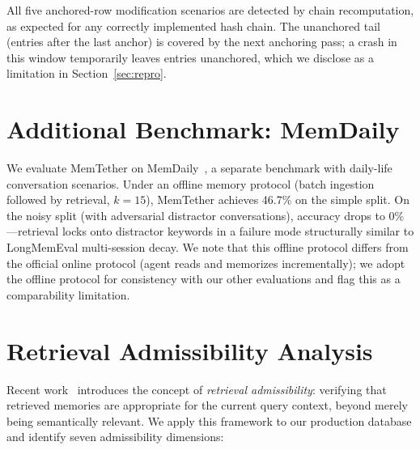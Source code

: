 \documentclass{article}
\begin{document}
All five anchored-row modification scenarios are detected by chain recomputation, as expected for any correctly implemented hash chain. The unanchored tail (entries after the last anchor) is covered by the next anchoring pass; a crash in this window temporarily leaves entries unanchored, which we disclose as a limitation in Section~\ref{sec:repro}.



\section{Additional Benchmark: MemDaily}
\label{sec:memdaily}

We evaluate MemTether on MemDaily~\citep{memdaily}, a separate benchmark with daily-life conversation scenarios. Under an offline memory protocol (batch ingestion followed by retrieval, $k{=}15$), MemTether achieves 46.7\% on the simple split. On the noisy split (with adversarial distractor conversations), accuracy drops to 0\%---retrieval locks onto distractor keywords in a failure mode structurally similar to LongMemEval multi-session decay. We note that this offline protocol differs from the official online protocol (agent reads and memorizes incrementally); we adopt the offline protocol for consistency with our other evaluations and flag this as a comparability limitation.


\section{Retrieval Admissibility Analysis}
\label{sec:admissibility}

Recent work~\citep{admissibility} introduces the concept of \emph{retrieval admissibility}: verifying that retrieved memories are appropriate for the current query context, beyond merely being semantically relevant. We apply this framework to our production database and identify seven admissibility dimensions:
\end{document}
